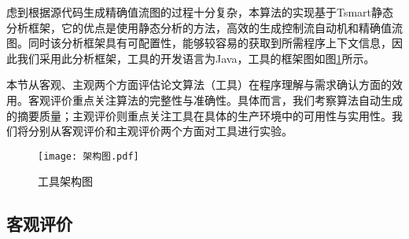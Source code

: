 虑到根据源代码生成精确值流图的过程十分复杂，本算法的实现基于Tsmart静态分析框架，它的优点是使用静态分析的方法，高效的生成控制流自动机和精确值流图。同时该分析框架具有可配置性，能够较容易的获取到所需程序上下文信息，因此我们采用此分析框架，工具的开发语言为Java，工具的框架图如图\ref{fig:架构图}所示。

本节从客观、主观两个方面评估论文算法（工具）在程序理解与需求确认方面的效用。客观评价重点关注算法的完整性与准确性。具体而言，我们考察算法自动生成的摘要质量；主观评价则重点关注工具在具体的生产环境中的可用性与实用性。我们将分别从客观评价和主观评价两个方面对工具进行实验。

\begin{figure}[H]
	\centering
	\texttt{[image: 架构图.pdf]}
	\caption{工具架构图}
	\label{fig:架构图}
\end{figure}

\subsection{客观评价}

